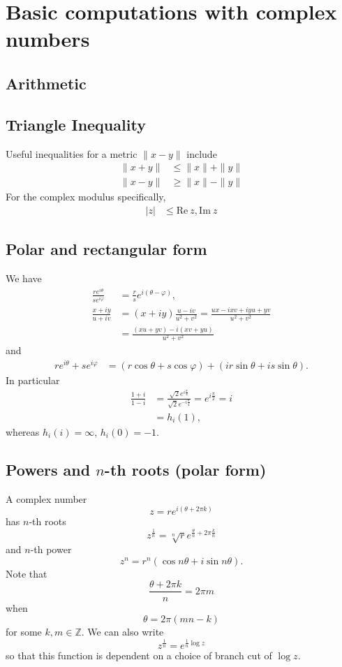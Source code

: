 \documentclass{article}
\renewcommand{\Im}{\mathrm{Im}}
\renewcommand{\Re}{\mathrm{Re}}
\renewcommand{\Im}{\mathrm{Im}}
\begin{document}
\section{Basic computations with complex numbers}

\subsection{Arithmetic}

\subsection{Triangle Inequality}
Useful inequalities for a metric
$\| x - y \|$ include
\begin{align*}
      \| x + y \|
&\leq \| x \| + \| y \| \\
      \| x - y \|
&\geq \| x \| - \| y \|
\end{align*}
For the complex modulus specifically,
\begin{align*}
      | z |
&\leq \Re~z, \Im~z
\end{align*}

\subsection{Polar and rectangular form}

We have
\begin{align*}
   \frac{r e^{i\theta}}
        {s e^{i\varphi}}
&= \frac{r}{s} e^{i(\theta - \varphi)}, \\
   \frac{x + iy}
        {u + iv}
&= (x + iy)
   \frac{u - iv}
        {u^2 + v^2}
 = \frac{ux - ixv + iyu + yv}
        {u^2 + v^2} \\
&= \frac{(xu + yv) - i(xv + yu)}
        {u^2 + v^2}
\end{align*}
and
\begin{align*}
   r e^{i \theta} + s e^{i \varphi}
&= (r \cos \theta
 +  s \cos \varphi)
 + (ir \sin \theta
 +  is \sin \theta).
\end{align*}
In particular
\begin{align*}
   \frac{1 + i}
        {1 - i}
&= \frac{\sqrt{2} e^{i \frac{\pi}{4}}}
        {\sqrt{2} e^{-i\frac{\pi}{4}}}
 = e^{i \frac{\pi}{2}} = i \\
&= h_i(1),
\end{align*}
whereas $h_i(i) = \infty$, $h_i(0) = -1$.

\subsection{Powers and $n$-th roots (polar form)}
A complex number
$$
z = r e^{i (\theta + 2 \pi k)}
$$
has $n$-th roots
$$
  z^{\frac{1}{n}}
= \sqrt[n]{r} e^{\frac{\theta}{n} + 2 \pi \frac{k}{n}}
$$
and $n$-th power
$$
  z^n
= r^n (\cos n\theta + i \sin n\theta).
$$
Note that
$$
\frac{\theta + 2 \pi k}{n} = 2 \pi m
$$
when
$$
\theta = 2 \pi (mn - k)
$$
for some $k, m \in \mathbb{Z}$.
We can also write
$$
  z^{\frac{1}{n}}
= e^{\frac{1}{n} \log z}
$$
so that this function is dependent on a choice of branch cut
of $\log z$.
\end{document}
